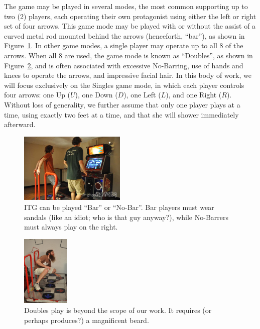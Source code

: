\documentclass[10pt]{sigplanconf}
\begin{document}
The game may be played in several modes, the most common supporting up to two (2) players, each operating their own protagonist using either the left or right set of four arrows.
This game mode may be played with or without the assist of a curved metal rod mounted behind the arrows (henceforth, ``bar''), as shown in Figure~\ref{fig:bengreg}.
In other game modes, a single player may operate up to all 8 of the arrows. When all 8 are used, the game mode is known as ``Doubles'', as shown in Figure~\ref{fig:jim}, and is often associated with excessive No-Barring, use of hands and knees to operate the arrows, and impressive facial hair.
In this body of work, we will focus exclusively on the Singles game mode, in which each player controls four arrows: one Up ($U$), one Down ($D$), one Left ($L$), and one Right ($R$). Without loss of generality, we further assume that only one player plays at a time, using exactly two feet at a time, and that she will shower immediately afterward.

\begin{figure}[t]
	\begin{center}
	\includegraphics[width=0.45\textwidth]{bengreg.jpg}
	\end{center}
	\caption{ITG can be played ``Bar'' or ``No-Bar''. Bar players must wear sandals (like an idiot; who is that guy anyway?), while No-Barrers must always play on the right.}
	\label{fig:bengreg}
\end{figure}
\begin{figure}[t]
	\begin{center}
	\includegraphics[width=0.2\textwidth]{jim.jpg}
	\end{center}
	\caption{Doubles play is beyond the scope of our work. It requires (or perhaps produces?) a magnificent beard.}
	\label{fig:jim}
\end{figure}
\end{document}
